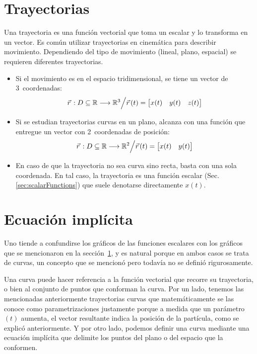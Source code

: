 \documentclass[a5paper,12pt,twoside]{book}
\begin{document}
\begin{center}
    \def\svgwidth{0.8\linewidth}
    
\end{center}


\section{Trayectorias}
\label{A:trajectory}

Una trayectoria es una función vectorial que toma un escalar y lo transforma en un vector.
Es común utilizar trayectorias en cinemática para describir movimiento.
Dependiendo del tipo de movimiento (lineal, plano, espacial) se requieren diferentes trayectorias.
\begin{itemize}
  \item Si el movimiento es en el espacio tridimensional, se tiene un vector de 3~coordenadas:
    \[
      \vec{r}\hspace{0.05cm}:D \subseteq \mathbb{R} \longrightarrow \mathbb{R}^3 \Big/ \vec{r}\hspace{0.05cm}(t) =
        \begin{bmatrix} x(t) & y(t) & z(t) \end{bmatrix}
    \]
  \item Si se estudian trayectorias curvas en un plano, alcanza con una función que entregue un vector con 2~coordenadas de posición:
    \[
      \vec{r}\hspace{0.05cm}:D \subseteq \mathbb{R} \longrightarrow \mathbb{R}^2 \Big/ \vec{r}\hspace{0.05cm}(t) =
        \begin{bmatrix} x(t) & y(t) \end{bmatrix}
    \]
  \item En caso de que la trayectoria no sea curva sino recta, basta con una sola coordenada. En tal caso, la trayectoria es una función escalar (Sec. \ref{sec:scalarFunctions}) que suele denotarse directamente $x(t)$.
\end{itemize}


\section{Ecuación implícita}

Uno tiende a confundirse los gráficos de las funciones escalares con los gráficos que se mencionaron en la sección~\ref{A:trajectory}, y es natural porque en ambos casos se trata de curvas, un concepto que se mencionó pero todavía no se definió rigurosamente.

Una curva puede hacer referencia a la función vectorial que recorre su trayectoria, o bien al conjunto de puntos que conforman la curva. Por un lado, tenemos las mencionadas anteriormente trayectorias curvas que matemáticamente se las conoce como parametrizaciones justamente porque a medida que un parámetro $(t)$ aumenta, el vector resultante indica la posición de la partícula, como se explicó anteriormente. Y por otro lado, podemos definir una curva mediante una ecuación implícita que delimite los puntos del plano o del espacio que la conformen.
\end{document}
